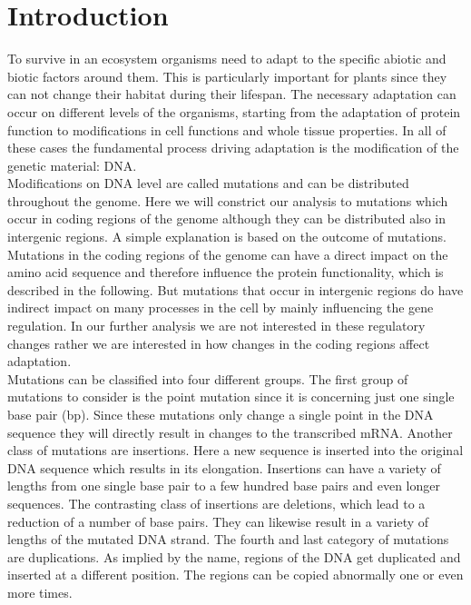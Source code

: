 \chapter{Introduction}
To survive in an ecosystem organisms need to adapt to the specific abiotic and biotic factors around them. This is particularly important for plants since they can not change their habitat during their lifespan. The necessary adaptation can occur on different levels of the organisms, starting from the adaptation of protein function to modifications in cell functions and whole tissue properties. In all of these cases the fundamental process driving adaptation is the modification of the genetic material: DNA.\\
Modifications on DNA level are called mutations and can be distributed throughout the genome. Here we will constrict our analysis to mutations which occur in coding regions of the genome although they can be distributed also in intergenic regions. A simple explanation is based on the outcome of mutations. Mutations in the coding regions of the genome can have a direct impact on the amino acid sequence and therefore influence the protein functionality, which is described in the following. But mutations that occur in intergenic regions do have indirect impact on many processes in the cell by mainly influencing the gene regulation. In our further analysis we are not interested in these regulatory changes rather we are interested in how changes in the coding regions affect adaptation.\\
Mutations can be classified into four different groups. The first group of mutations to consider is the point mutation since it is concerning just one single base pair (bp). Since these mutations only change a single point in the DNA sequence they will directly result in changes to the transcribed mRNA. Another class of mutations are insertions. Here a new sequence is inserted into the original DNA sequence which results in its elongation. Insertions can have a variety of lengths from one single base pair to a few hundred base pairs and even longer sequences. The contrasting class of insertions are deletions, which lead to a reduction of a number of base pairs. They can likewise result in a variety of lengths of the mutated DNA strand. The fourth and last category of mutations are duplications. As implied by the name, regions of the DNA get duplicated and inserted at a different position. The regions can be copied abnormally one or even more times.\\
